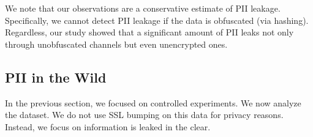 We note that our observations are a conservative estimate of PII leakage. Specifically, 
we cannot detect PII leakage if the data is obfuscated (\eg via hashing). Regardless, 
our study showed that a significant amount of PII leaks not only through unobfuscated 
channels but even unencrypted ones. 



\subsection{PII in the Wild}

In the previous section, we focused on controlled experiments. We now
analyze the \mobWild{} dataset. We do not use SSL bumping on this data 
for privacy reasons. Instead, we focus on information is leaked in the clear.


